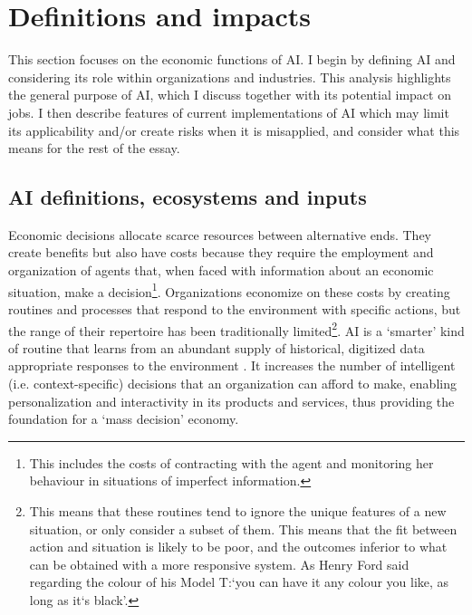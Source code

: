 \documentclass[11pt]{article}
\begin{document}
\section{Definitions and impacts}
\label{sec:definition}

This section focuses on the economic functions of AI. I begin by defining AI and considering its role within organizations and industries. This analysis highlights the general purpose of AI, which I discuss together with its potential impact on jobs. I then describe features of current implementations of AI which may limit its applicability and/or create risks when it is misapplied, and consider what this means for the rest of the essay.

\subsection{AI definitions, ecosystems and inputs}
\label{subsec:systems}
Economic decisions allocate scarce resources between alternative ends. They create benefits but also have costs because they require the employment and organization of agents that, when faced with information about an economic situation, make a decision\footnote{This includes the costs of contracting with the agent and monitoring her behaviour in situations of imperfect information.}. Organizations economize on these costs by creating routines and processes that respond to the environment with specific actions, but the range of their repertoire has been traditionally limited\footnote{This means that these routines tend to ignore the unique features of a new situation, or only consider a subset of them. This means that the fit between action and situation is likely to be poor, and the outcomes inferior to what can be obtained with a more responsive system. As Henry Ford said regarding the colour of his Model T:`you can have it any colour you like, as long as it`s black'.}. AI is a `smarter' kind of routine that learns from an abundant supply of historical, digitized data appropriate responses to the environment . It increases the number of intelligent (i.e. context-specific) decisions that an organization can afford to make, enabling personalization and interactivity in its products and services, thus providing the foundation for a `mass decision' economy.
\end{document}
